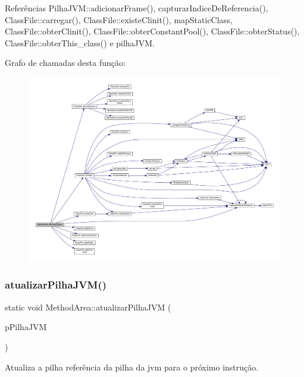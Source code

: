 Referências Pilha\+J\+V\+M\+::adicionar\+Frame(), capturar\+Indice\+De\+Referencia(), Class\+File\+::carregar(), Class\+File\+::existe\+Clinit(), map\+Static\+Class, Class\+File\+::obter\+Clinit(), Class\+File\+::obter\+Constant\+Pool(), Class\+File\+::obter\+Status(), Class\+File\+::obter\+This\+\_\+class() e pilha\+J\+VM.

Grafo de chamadas desta função\+:\nopagebreak
\begin{figure}[H]
\begin{center}
\leavevmode
\includegraphics[width=350pt]{classMethodArea_ac2a5ab0e6b36c9af7062f145218b4cf0_cgraph}
\end{center}
\end{figure}
\mbox{\label{classMethodArea_a6ee32cdf91b461ff3c8a278b5d0cd126}} 
\subsubsection{\texorpdfstring{atualizar\+Pilha\+J\+V\+M()}{atualizarPilhaJVM()}}
{\footnotesize\ttfamily static void Method\+Area\+::atualizar\+Pilha\+J\+VM (\begin{DoxyParamCaption}\item[{\hyperlink{classPilhaJVM}{Pilha\+J\+VM} $\ast$}]{p\+Pilha\+J\+VM }\end{DoxyParamCaption})\hspace{0.3cm}{\ttfamily [static]}}



Atualiza a pilha referência da pilha da jvm para o próximo instrução. 


